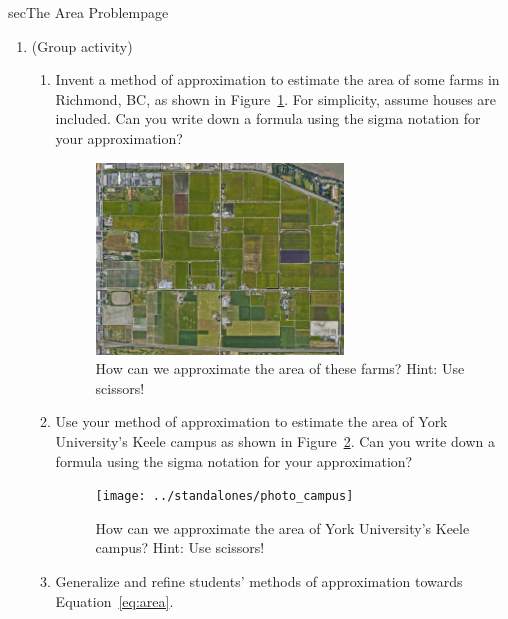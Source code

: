 \documentclass[../main]{subfiles}
\begin{document}
\begin{outline}{sec}{The Area Problem}{page} \label{outline:area}
  \begin{enumerate}
    \item (Group activity) 
      \begin{enumerate}
        \item Invent a method of approximation to estimate the area of some farms in Richmond, BC, as shown in Figure~\ref{fig:integral_farms}. For simplicity, assume houses are included. Can you write down a formula using the sigma notation for your approximation?
          \begin{figure}[h]  %
            \centering
            \includegraphics[height=2in]{../standalones/photo_farms}
            \caption{How can we approximate the area of these farms? Hint: Use scissors!}
            \label{fig:integral_farms}
          \end{figure}

        \item Use your method of approximation to estimate the area of York University's Keele campus as shown in Figure~\ref{fig:integral_campus}. Can you write down a formula using the sigma notation for your approximation?
          \begin{figure}[h]  %
            \centering
            \texttt{[image: ../standalones/photo\_campus]}
            \caption{How can we approximate the area of York University's Keele campus? Hint: Use scissors!}
            \label{fig:integral_campus}
          \end{figure}

        \item[\faIcon{star}] Generalize and refine students' methods of approximation towards Equation~\eqref{eq:area}.
      \end{enumerate}


\end{enumerate}
\end{outline}
\end{document}
